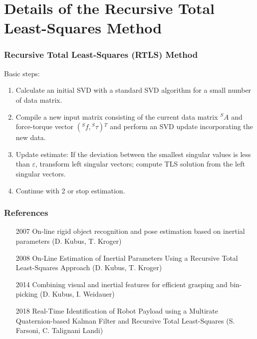 \documentclass[usenames,dvipsnames]{beamer}
\begin{document}
\section{Details of the Recursive Total Least-Squares Method}

\begin{frame}
 \frametitle{Recursive Total Least-Squares (RTLS) Method}

 Basic steps:

 \begin{enumerate}
  \item Calculate an initial SVD with a standard SVD algorithm for a small number of data matrix.
  \item Compile a new input matrix consisting of the current data matrix ${}^S A$ and force-torque vector $({}^S f, {}^S \tau ) {}^T$ and perform an SVD update incorporating the new data.
  \item Update estimate: If the deviation between the smallest singular values is less than $\varepsilon$, transform left singular vectors; compute TLS solution from the left singular vectors.
  \item Continue with 2 or stop estimation.
\end{enumerate}

\end{frame}

\begin{frame}
 \frametitle{References}

 \begin{itemize}
  \item [2007] On-line rigid object recognition and pose estimation based on inertial parameters (D. Kubus, T. Kroger)
  \item [2008] On-Line Estimation of Inertial Parameters Using a Recursive Total Least-Squares Approach (D. Kubus, T. Kroger)
  \item [2014] Combining visual and inertial features for efficient grasping and bin-picking (D. Kubus, I. Weidauer)
  \item [2018] Real-Time Identification of Robot Payload using a Multirate Quaternion-based Kalman Filter and Recursive Total Least-Squares (S. Farsoni, C. Talignani Landi)

 \end{itemize}
\end{frame}
\end{document}
